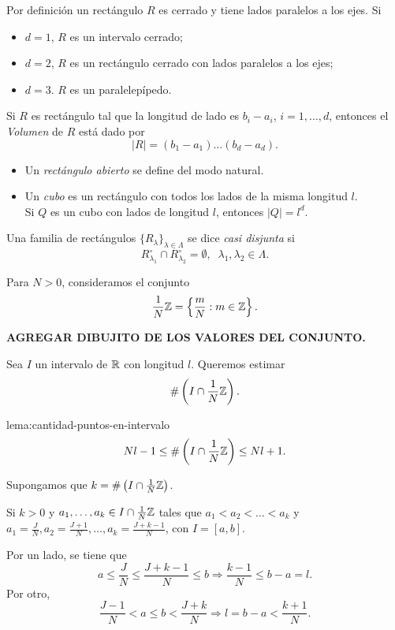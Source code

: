 \begin{observacion}{}
Por definici\'on un rect\'angulo $R$ es cerrado y tiene lados paralelos a los ejes. Si 
\begin{itemize}
    \item $d=1$, $R$ es un intervalo cerrado;
    \item $d=2$, $R$ es un rect\'angulo cerrado con lados paralelos a los ejes;
    \item $d=3$. $R$ es un paralelep\'ipedo.
\end{itemize}
\end{observacion}

Si $R$ es rect\'angulo tal que la longitud de lado es $b_i-a_i$, $i=1,\ldots,d$, entonces el \emph{Volumen} de $R$ est\'a dado por
\[
|R|=(b_1-a_1)\ldots(b_d-a_d).
\]

\begin{itemize}
    \item Un \emph{rect\'angulo abierto} se define del modo natural.
    \item Un \emph{cubo} es un rect\'angulo con todos los lados de la misma longitud $l$. \\
    Si $Q$ es un cubo con lados de longitud $l$, entonces $|Q|=l^d$.
\end{itemize}

Una familia de rect\'angulos $\{R_{\lambda}\}_{\lambda \in \Lambda}$ se dice \emph{casi disjunta} si 
\[
R_{\lambda_1}^{\circ} \cap R_{\lambda_2}^{\circ}=\emptyset, \;\; \lambda_1,\lambda_2 \in \Lambda.
\]

Para $N>0$, consideramos el conjunto 
\[
\frac{1}{N}\mathbb{Z}=\left\{ \frac{m}{N}: m\in \mathbb{Z}   \right\}.
\]

\textbf{AGREGAR DIBUJITO DE LOS VALORES DEL CONJUNTO.}


Sea $I$ un intervalo de $\mathbb{R}$ con longitud $l$. Queremos estimar 
\[
\# \left(I \cap \frac{1}{N}\mathbb{Z} \right).
\]

\begin{lema}{lema:cantidad-puntos-en-intervalo}
\[
Nl-1 \leq \# \left(I \cap \frac{1}{N}\mathbb{Z} \right) \leq Nl+1.\]
\end{lema}

\begin{demo}

Supongamos que $k=\# \left(I \cap \frac{1}{N}\mathbb{Z} \right)$.

Si $k>0$ y $a_1,\ldots,a_k \in I \cap \frac{1}{N}\mathbb{Z}$ tales que 
$a_1<a_2<\ldots<a_k$ y $a_1=\frac{J}{N},a_2=\frac{J+1}{N},\ldots,a_k=\frac{J+k-1}{N}$, con 
$I=[a,b]$. 

Por un lado, se tiene que
\[
a\leq \frac{J}{N}\leq \frac{J+k-1}{N}\leq b \Rightarrow
\frac{k-1}{N}\leq b-a=l.
\]
Por otro, 
\[
\frac{J-1}{N}< a\leq b<\frac{J+k}{N} \Rightarrow
l=b-a< \frac{k+1}{N}.
\]
\end{demo}

